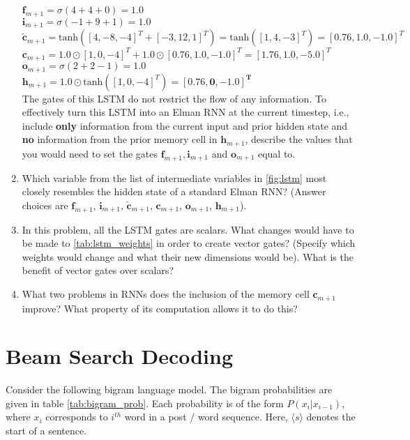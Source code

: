 \documentclass[12pt, letterpaper]{article}
\begin{document}
\begin{enumerate}
$\boldsymbol{f}_{m+1} = \sigma(4 + 4 + 0) = 1.0$ \\
\indent $\boldsymbol{i}_{m+1} = \sigma(-1 + 9 + 1) = 1.0$ \\
\indent $\boldsymbol{\tilde{c}}_{m+1} = \text{tanh}([4, -8, -4]^T + [-3, 12, 1]^T) = \text{tanh}([1,4,-3]^T) = [0.76, 1.0, -1.0]^T$\\
\indent $\boldsymbol{c}_{m+1} = 1.0 \odot [1,0,-4]^T + 1.0 \odot [0.76, 1.0, -1.0]^T = [1.76, 1.0, -5.0]^T $ \\
\indent $\boldsymbol{o}_{m+1} = \sigma(2 + 2 - 1) = 1.0$\\
\indent $\boldsymbol{h}_{m+1} = 1.0 \odot \text{tanh}([1,0,-4]^T) = \mathbf{[0.76, 0, -1.0]^T}$\\

The gates of this LSTM do not restrict the flow of any information. To effectively turn this LSTM into an Elman RNN at the current timestep, i.e., include \textbf{only} information from the current input and prior hidden state and \textbf{no} information from the prior memory cell in $\boldsymbol{h}_{m+1}$, describe the values that you would need to set the gates $\boldsymbol{f}_{m+1}, \boldsymbol{i}_{m+1}$ and $\boldsymbol{o}_{m+1}$ equal to.

\item Which variable from the list of intermediate variables in \autoref{fig:lstm} most closely resembles the hidden state of a standard Elman RNN? (Answer choices are $\boldsymbol{f}_{m+1}$, $\boldsymbol{i}_{m+1}$, $\boldsymbol{\tilde c}_{m+1}$, $\boldsymbol{c}_{m+1}$, $\boldsymbol{o}_{m+1}$, $\boldsymbol{h}_{m+1}$).

\item In this problem, all the LSTM gates are scalars. What changes would have to be made to \autoref{tab:lstm_weights} in order to create vector gates? (Specify which weights would change and what their new dimensions would be). What is the benefit of vector gates over scalars?

\item What two problems in RNNs does the inclusion of the memory cell $\boldsymbol{c}_{m+1}$ improve? What property of its computation allows it to do this?

\end{enumerate}


\section{Beam Search Decoding}
Consider the following bigram language model. The bigram probabilities are given in table \ref{tab:bigram_prob}. Each probability is of the form $P(x_i|x_{i-1})$, where $x_i$ corresponds to $i^{th}$ word in a post / word sequence. Here, $\langle s \rangle$ denotes the start of a sentence.
\end{document}
